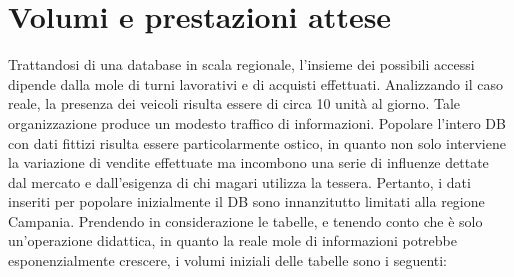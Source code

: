\documentclass[12pt]{report}
\begin{document}
\section{Volumi e prestazioni attese}
Trattandosi di una database in scala regionale, l'insieme dei possibili accessi dipende dalla mole di turni lavorativi e di acquisti effettuati. Analizzando il caso reale, la presenza dei veicoli risulta essere di circa 10 unità al giorno. Tale organizzazione produce un modesto traffico di informazioni. Popolare l'intero DB con dati fittizi risulta essere particolarmente ostico, in quanto non solo interviene la variazione di vendite effettuate ma incombono una serie di influenze dettate dal mercato e dall'esigenza di chi magari utilizza la tessera. Pertanto, i dati inseriti per popolare inizialmente il DB sono innanzitutto limitati alla regione Campania. Prendendo in considerazione le tabelle, e tenendo conto che è solo un'operazione didattica, in quanto la reale mole di informazioni potrebbe esponenzialmente crescere, i volumi iniziali delle tabelle sono i seguenti:
\end{document}
